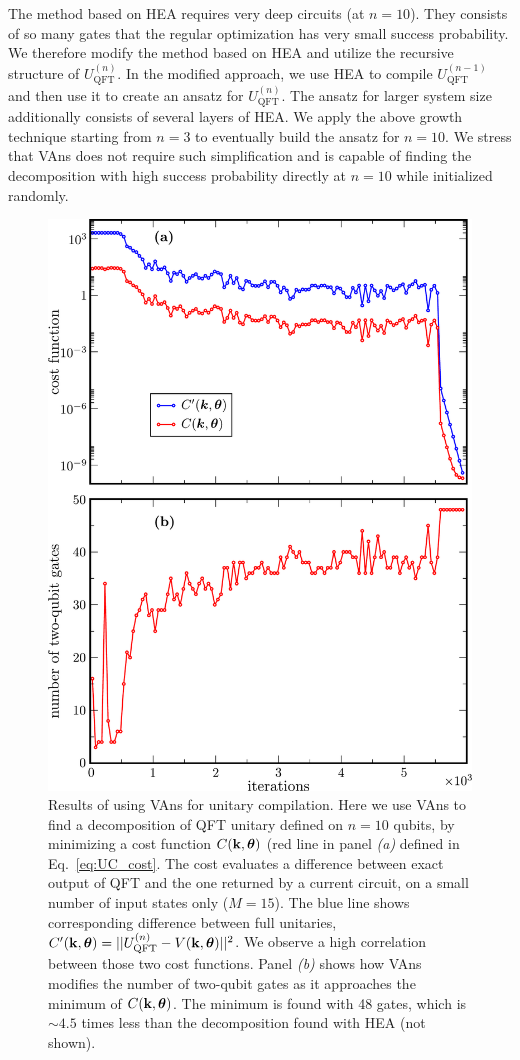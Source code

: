 The method based on HEA requires very deep circuits (at $n=10$). They consists of so many gates that the regular optimization has very small success probability. We therefore modify the method based on HEA and utilize the recursive structure of $U_\mathrm{QFT}^{(n)}$. In the modified approach, we use HEA to compile $U_\mathrm{QFT}^{(n-1)}$ and then use it to create an ansatz for $U_\mathrm{QFT}^{(n)}$. The ansatz for larger system size additionally consists of several layers of HEA. We apply the above growth technique starting from $n=3$ to eventually build the ansatz for $n=10$. We stress that VAns does not require such simplification and is capable of finding the decomposition  with high success probability directly at $n=10$ while initialized randomly.

\begin{figure}[t!]
\centering
\includegraphics[width=.75\textwidth]{Figures/VANS/unitary_compilation.pdf}
\caption{Results of using VAns for unitary compilation. Here we use VAns to find a decomposition of QFT unitary defined on $n=10$ qubits, by minimizing a cost function $C(\mathbf{k},\bm{\theta})$ (red line in panel \textit{(a)} defined in Eq.~\eqref{eq:UC_cost}. The cost evaluates a difference between exact output of QFT and the one returned by a current circuit, on a small number of input states only ($M=15$). The blue line shows corresponding difference between full unitaries, $C'(\mathbf{k},\bm{\theta}) = || U_\mathrm{QFT}^{(n)} - V(\mathbf{k},\bm{\theta})||^2$. We observe a high correlation between those two cost functions. Panel \textit{(b)} shows how VAns modifies the number of two-qubit gates as it approaches the minimum of $C(\mathbf{k},\bm{\theta})$.
The minimum is found with 48 gates, which is $\sim 4.5$ times less than the decomposition found with HEA (not shown).
}
\label{fig:unitary_compilation_results}
\end{figure}
\afterpage{\clearpage}


